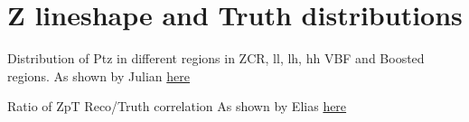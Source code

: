 \section{Z lineshape and Truth distributions}
\label{sec:truthcomparisons}

Distribution of Ptz in different regions in ZCR, ll, lh, hh VBF and Boosted regions. As shown by Julian \href{https://indico.cern.ch/event/547600/contributions/2223874/attachments/1301613/1946472/ZTheorySystematicsEdBoard_30Jun2016.pdf}{here}

Ratio of ZpT Reco/Truth correlation As shown by Elias \href{https://indico.cern.ch/event/538713/contributions/2189375/attachments/1309224/1958314/160714_EB.pdf}{here}
